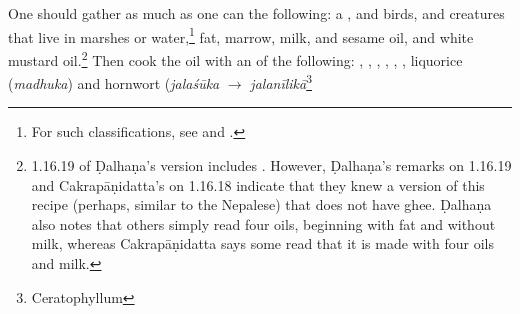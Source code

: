 \begin{translation}
    One should gather as much as one can the following: a
    , %
     and  birds, and
    creatures that live in marshes or water,\footnote{For such classifications,
    see \citet{zimm-1999} and \citet{smit-1994}.} fat, marrow, milk, and sesame oil, and
    white mustard oil.\footnote{1.16.19 of Ḍalhaṇa's version \citep[79]{vulgate} includes . However, Ḍalhaṇa's remarks on 1.16.19 and Cakrapāṇidatta's on 1.16.18 \citep[130]{acar-1939} indicate that they knew a version of this recipe  (perhaps, similar to the Nepalese) that does not have ghee. Ḍalhaṇa also notes that others simply read four oils, beginning with fat and without milk, whereas Cakrapāṇidatta says some read that it is made with four oils and milk.} %
Then cook the oil with an  of the following:
    , %
    , %
    , %
    , %
    , %
    , %
    liquorice (\emph{madhuka}) and
    hornwort (\emph{jalaśūka} $\rightarrow$ \emph{jalanīlikā}\footnote{Ceratophyllum
}
\end{translation}
